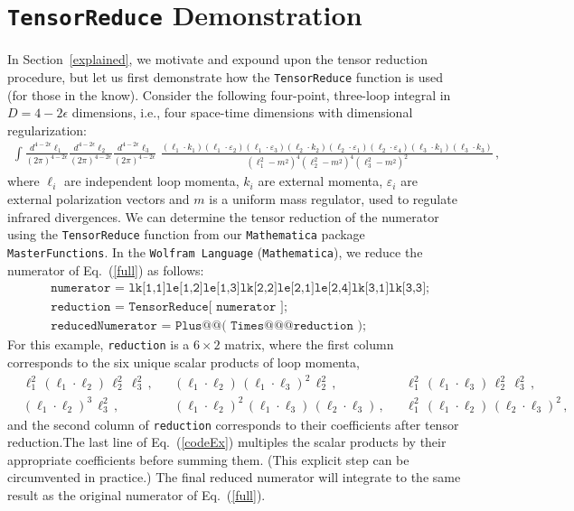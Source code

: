 \documentclass[aps,prd,preprint,eqsecnum,tightenlines,nofootinbib,showpacs]{revtex4}
\def\eqn#1{Eq.~({\ref{#1}})}
\def\sect#1{Section~{\ref{#1}}}
\begin{document}
 

\section{\texttt{T\lowercase{ensor}R\lowercase{educe}} Demonstration}

In \sect{explained}, we motivate and expound upon the tensor reduction procedure, but
let us first demonstrate how the \texttt{TensorReduce} function is used (for those in the know). 
Consider the following four-point, three-loop integral in $D = 4-2\epsilon$
dimensions, i.e., four space-time dimensions with dimensional regularization:
%
\begin{align}
\int 
\frac{d^{4-2\epsilon}\ell_{1}}{(2\pi)^{4-2\epsilon}}
\frac{d^{4-2\epsilon}\ell_{2}}{(2\pi)^{4-2\epsilon}}
\frac{d^{4-2\epsilon}\ell_{3}}{(2\pi)^{4-2\epsilon}}
\,\,
\frac{
(\ell_{1}\cdot k_{1})(\ell_{1}\cdot\varepsilon_{2})(\ell_{1}\cdot\varepsilon_{3})
(\ell_{2}\cdot k_{2})(\ell_{2}\cdot\varepsilon_{1})(\ell_{2}\cdot\varepsilon_{4})
(\ell_{3}\cdot k_{1})(\ell_{3}\cdot k_{3})}
{(\ell_{1}^{2}-m^{2})^{4} (\ell_{2}^{2}-m^{2})^{4} (\ell_{3}^{2}-m^{2})^{2}}\,,
\label{full}
\end{align}
%
where $\ell_{i}$ are independent loop momenta, $k_{i}$ are external momenta,
$\varepsilon_{i}$ are external polarization vectors and $m$ is a uniform mass
regulator, used to regulate infrared divergences.
We can determine the tensor reduction of the numerator using the
\texttt{TensorReduce} function from our \texttt{Mathematica} package \texttt{MasterFunctions}. 
In the \texttt{Wolfram Language} (\texttt{Mathematica}), we reduce the numerator of \eqn{full} as follows:
\begin{align}
&\texttt{numerator = lk[1,1]le[1,2]le[1,3]lk[2,2]le[2,1]le[2,4]lk[3,1]lk[3,3];}\nonumber\\
&\texttt{reduction = TensorReduce[ numerator ];} \nonumber\\
&\texttt{reducedNumerator = Plus@@( Times@@@reduction );}
\label{codeEx}
\end{align}
For this example, \texttt{reduction} is a $6\times2$ matrix, where the first column corresponds 
to the six unique scalar products of loop momenta,
\begin{align}
&\ell_{1}^{2} \, (\ell_{1}\cdot\ell_{2}) \, \ell_{2}^{2} \, \ell_{3}^{2} \,,
&&(\ell_{1}\cdot\ell_{2}) \, (\ell_{1}\cdot\ell_{3})^{2} \, \ell_{2}^{2} \,,
&&\ell_{1}^{2}\, (\ell_{1}\cdot\ell_{3})\, \ell_{2}^{2}\, \ell_{3}^{2} \,,
\nonumber\\[.2cm]
&(\ell_{1}\cdot\ell_{2})^{3}\, \ell_{3}^{2} \,,
&&(\ell_{1}\cdot\ell_{2})^{2}\, (\ell_{1}\cdot\ell_{3})\, (\ell_{2}\cdot\ell_{3}) \,,
&&\ell_{1}^{2}\, (\ell_{1}\cdot\ell_{2})\, (\ell_{2}\cdot\ell_{3})^{2} \,,
\label{scalar0}
\end{align}
and the second column of \texttt{reduction} corresponds to their
coefficients after tensor reduction.The last
line of \eqn{codeEx} multiples the scalar products by their appropriate coefficients
before summing them. (This explicit step can be circumvented in practice.) 
The final reduced numerator will integrate to the same result
as the original numerator of \eqn{full}.
\end{document}
